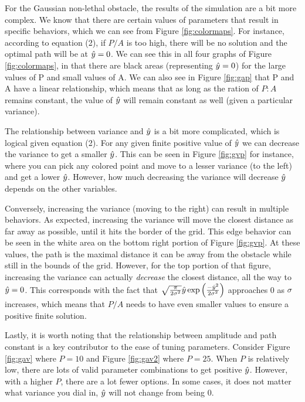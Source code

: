For the Gaussian non-lethal obstacle, the results of the simulation are a bit more complex. We know that there are certain values of parameters that result in specific behaviors, which we can see from Figure \ref{fig:colormaps}. For instance, according to equation (2), if $P/A$ is too high, there will be no solution and the optimal path will be at $\hat{y}=0$. We can see this in all four graphs of Figure \ref{fig:colormaps}, in that there are black areas (representing $\hat{y}=0$) for the large values of P and small values of A. We can also see in Figure \ref{fig:gap} that P and A have a linear relationship, which means that as long as the ration of $P:A$ remains constant, the value of $\hat{y}$ will remain constant as well (given a particular variance). 

The relationship between variance and $\hat{y}$ is a bit more complicated, which is logical given equation (2). For any given finite positive value of $\hat{y}$ we can decrease the variance to get a smaller $\hat{y}$. This can be seen in Figure \ref{fig:gvp} for instance, where you can pick any colored point and move to a lesser variance (to the left) and get a lower $\hat{y}$. However, how much decreasing the variance will decrease $\hat{y}$ depends on the other variables. 

Conversely, increasing the variance (moving to the right) can result in multiple behaviors. As expected, increasing the variance will move the closest distance as far away as possible, until it hits the border of the grid. This edge behavior can be seen in the white area on the bottom right portion of Figure \ref{fig:gvp}. At these values, the path is the maximal distance it can be away from the obstacle while still in the bounds of the grid. However, for the top portion of that figure, increasing the variance can actually \emph{decrease} the closest distance, all the way to $\hat{y}=0$. This corresponds with the fact that $ \sqrt{\frac{\pi}{2\sigma^2}} \hat{y} \exp\Big( \frac{-\hat{y}^2}{2\sigma^2} \Big) $ approaches 0 as $\sigma$ increases, which means that $P/A$ needs to have even smaller values to ensure a positive finite solution. 

Lastly, it is worth noting that the relationship between amplitude and path constant is a key contributor to the ease of tuning parameters. Consider Figure \ref{fig:gav} where $P=10$ and Figure \ref{fig:gav2} where $P=25$. When $P$ is relatively low, there are lots of valid parameter combinations to get positive $\hat{y}$. However, with a higher $P$, there are a lot fewer options. In some cases, it does not matter what variance you dial in, $\hat{y}$ will not change from being 0. 

